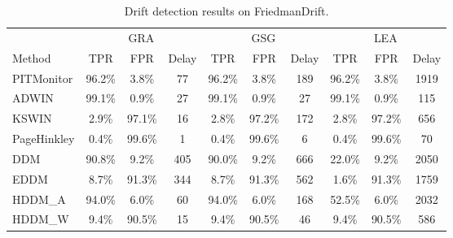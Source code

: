 \begin{table}[t]
\centering
\small
\caption{Drift detection results on FriedmanDrift.}
\label{tab:results}
\begin{tabular}{l ccc ccc ccc}
\toprule
\multicolumn{1}{l}{} & \multicolumn{3}{c}{GRA} & \multicolumn{3}{c}{GSG} & \multicolumn{3}{c}{LEA} \\
\cmidrule(lr){2-4} \cmidrule(lr){5-7} \cmidrule(lr){8-10}
Method & TPR & FPR & Delay & TPR & FPR & Delay & TPR & FPR & Delay \\
\midrule
PITMonitor & 96.2\% & 3.8\% & 77 & 96.2\% & 3.8\% & 189 & 96.2\% & 3.8\% & 1919 \\
ADWIN & 99.1\% & 0.9\% & 27 & 99.1\% & 0.9\% & 27 & 99.1\% & 0.9\% & 115 \\
KSWIN & 2.9\% & 97.1\% & 16 & 2.8\% & 97.2\% & 172 & 2.8\% & 97.2\% & 656 \\
PageHinkley & 0.4\% & 99.6\% & 1 & 0.4\% & 99.6\% & 6 & 0.4\% & 99.6\% & 70 \\
DDM & 90.8\% & 9.2\% & 405 & 90.0\% & 9.2\% & 666 & 22.0\% & 9.2\% & 2050 \\
EDDM & 8.7\% & 91.3\% & 344 & 8.7\% & 91.3\% & 562 & 1.6\% & 91.3\% & 1759 \\
HDDM\_A & 94.0\% & 6.0\% & 60 & 94.0\% & 6.0\% & 168 & 52.5\% & 6.0\% & 2032 \\
HDDM\_W & 9.4\% & 90.5\% & 15 & 9.4\% & 90.5\% & 46 & 9.4\% & 90.5\% & 586 \\
\bottomrule
\end{tabular}
\end{table}